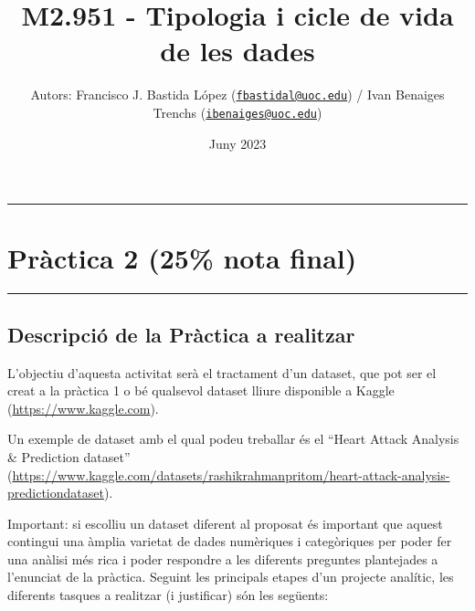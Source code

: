 \documentclass[
]{article}
\title{M2.951 - Tipologia i cicle de vida de les dades}
\author{Autors: Francisco J. Bastida López
(\href{mailto:fbastidal@uoc.edu}{\nolinkurl{fbastidal@uoc.edu}}) / Ivan
Benaiges Trenchs
(\href{mailto:ibenaiges@uoc.edu}{\nolinkurl{ibenaiges@uoc.edu}})}
\date{Juny 2023}
\begin{document}
\maketitle

{
\setcounter{tocdepth}{2}
\tableofcontents
}
\begin{center}\rule{0.5\linewidth}{0.5pt}\end{center}

\hypertarget{pruxe0ctica-2-25-nota-final}{%
\section{Pràctica 2 (25\% nota
final)}\label{pruxe0ctica-2-25-nota-final}}

\begin{center}\rule{0.5\linewidth}{0.5pt}\end{center}

\hypertarget{descripciuxf3-de-la-pruxe0ctica-a-realitzar}{%
\subsection{Descripció de la Pràctica a
realitzar}\label{descripciuxf3-de-la-pruxe0ctica-a-realitzar}}

L'objectiu d'aquesta activitat serà el tractament d'un dataset, que pot
ser el creat a la pràctica 1 o bé qualsevol dataset lliure disponible a
Kaggle (\url{https://www.kaggle.com}).

Un exemple de dataset amb el qual podeu treballar és el ``Heart Attack
Analysis \& Prediction dataset''
(\url{https://www.kaggle.com/datasets/rashikrahmanpritom/heart-attack-analysis-predictiondataset}).

Important: si escolliu un dataset diferent al proposat és important que
aquest contingui una àmplia varietat de dades numèriques i categòriques
per poder fer una anàlisi més rica i poder respondre a les diferents
preguntes plantejades a l'enunciat de la pràctica. Seguint les
principals etapes d'un projecte analític, les diferents tasques a
realitzar (i justificar) són les següents:
\end{document}
